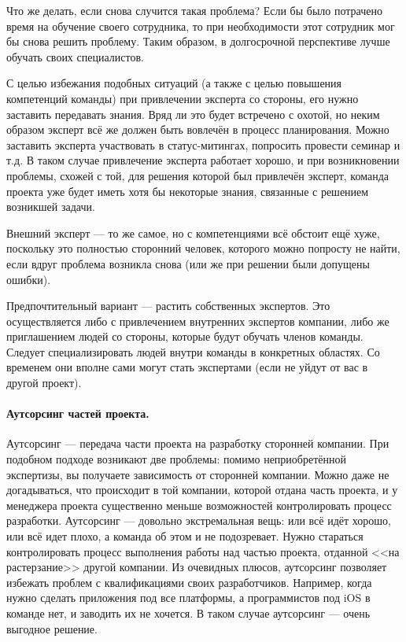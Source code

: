 \documentclass{../../text-style}
\begin{document}
Что же делать, если снова случится такая проблема? Если бы было потрачено время на обучение своего сотрудника, то при необходимости этот сотрудник мог бы снова решить проблему. Таким образом, в долгосрочной перспективе лучше обучать своих специалистов.

С целью избежания подобных ситуаций (а также с целью повышения компетенций команды) при привлечении эксперта со стороны, его нужно заставить передавать знания. Вряд ли это будет встречено с охотой, но неким образом эксперт всё же должен быть вовлечён в процесс планирования. Можно заставить эксперта участвовать в статус-митингах, попросить провести семинар и т.д. В таком случае привлечение эксперта работает хорошо, и при возникновении проблемы, схожей с той, для решения которой был привлечён эксперт, команда проекта уже будет иметь хотя бы некоторые знания, связанные с решением возникшей задачи.

Внешний эксперт --- то же самое, но с компетенциями всё обстоит ещё хуже, поскольку это полностью сторонний человек, которого можно попросту не найти, если вдруг проблема возникла снова (или же при решении были допущены ошибки).

Предпочтительный вариант --- растить собственных экспертов. Это осуществляется либо с привлечением внутренних экспертов компании, либо же приглашением людей со стороны, которые будут обучать членов команды. Следует специализировать людей внутри команды в конкретных областях. Со временем они вполне сами могут стать экспертами (если не уйдут от вас в другой проект).

\paragraph{Аутсорсинг частей проекта.} Аутсорсинг --- передача части проекта на разработку сторонней компании. При подобном подходе возникают две проблемы: помимо неприобретённой экспертизы, вы получаете зависимость от сторонней компании. Можно даже не догадываться, что происходит в той компании, которой отдана часть проекта, и у менеджера проекта существенно меньше возможностей контролировать процесс разработки. Аутсорсинг --- довольно экстремальная вещь: или всё идёт хорошо, или всё идет плохо, а команда об этом и не подозревает. Нужно стараться контролировать процесс выполнения работы над частью проекта, отданной <<на растерзание>> другой компании. Из очевидных плюсов, аутсорсинг позволяет избежать проблем с квалификациями своих разработчиков. Например, когда нужно сделать приложения под все платформы, а программистов под iOS в команде нет, и заводить их не хочется. В таком случае аутсорсинг --- очень выгодное решение.
\end{document}
